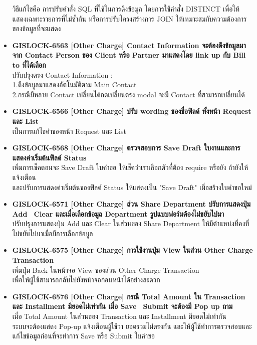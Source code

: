 \begin{itemize}
          วิธีแก้ไขคือ การปรับคำสั่ง SQL ที่ใช้ในการดึงข้อมูล โดยการใช้คำสั่ง DISTINCT เพื่อให้แสดงเฉพาะรายการที่ไม่ซ้ำกัน หรือการปรับโครงสร้างการ JOIN ให้เหมาะสมกับความต้องการของข้อมูลที่จะแสดง
    \item \textbf{{GISLOCK-6563 [Other Charge] Contact Information จะต้องดึงข้อมูลมาจาก Contact Person ของ Client หรือ Partner มาแสดงโดย link up กับ Bill to ที่ได้เลือก}} \\
          ปรับปรุงตรง Contact Information :\\
          1.ดึงข้อมูลมาแสดงอัตโนมัติตาม Main Contact \\
          2.กรณีมีหลาย Contact เปลี่ยนได้กดเปลี่ยนตรง modal จะมี Contact ที่สามารถเปลี่ยนได้
    \item \textbf{{GISLOCK-6566 [Other Charge] ปรับ wording ของชื่อฟิลด์ ทั้งหน้า Request และ List}} \\
          เป็นการแก้ไขคำของหน้า Request และ List
    \item \textbf{{GISLOCK-6568 [Other Charge] ตรวจสอบการ Save Draft ใบงานและการแสดงค่าเริ่มต้นฟิลด์ Status}} \\
          เพิ่มการเช็คตอนจะ Save Draft ใบคำขอ ให้เช็คว่าเราเลือกตัวที่ต้อง require หรือยัง ถ้ายังให้แจ้งเตือน \\
          และปรับการแสดงค่าเริ่มต้นของฟิลด์ Status ให้แสดงเป็น "Save Draft" เมื่อสร้างใบคำขอใหม่
    \item \textbf{{GISLOCK-6571 [Other Charge] ส่วน Share Department ปรับการแสดงปุ่ม Add \, Clear และเมื่อเลือกข้อมูล Department รูปแบบฟอร์มต้องไม่ขยับไปมา}} \\
          ปรับปรุงการแสดงปุ่ม Add และ Clear ในส่วนของ Share Department ให้มีตำแหน่งที่คงที่ ไม่ขยับไปมาเมื่อมีการเลือกข้อมูล 
    \item \textbf{{GISLOCK-6575 [Other Charge] การใช้งานปุ่ม View ในส่วน Other Charge Transaction}} \\
          เพิ่มปุ่ม Back ในหน้าจอ View ของส่วน Other Charge Transaction \\
          เพื่อให้ผู้ใช้สามารถกลับไปยังหน้าจอก่อนหน้าได้อย่างสะดวก
    \item \textbf{{GISLOCK-6576 [Other Charge] กรณี Total Amount ใน Transaction และ Installment มียอดไม่เท่ากัน เมื่อ Save \, Submit จะต้องมี Pop up ถาม}} \\
          เมื่อ Total Amount ในส่วนของ Transaction และ Installment มียอดไม่เท่ากัน \\
          ระบบจะต้องแสดง Pop-up แจ้งเตือนผู้ใช้ว่า ยอดรวมไม่ตรงกัน และให้ผู้ใช้ทำการตรวจสอบและแก้ไขข้อมูลก่อนที่จะทำการ Save หรือ Submit ใบคำขอ

\end{itemize}
